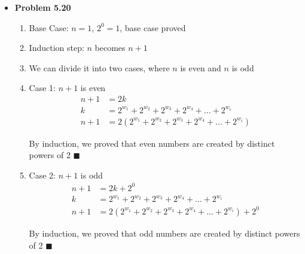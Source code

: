 \documentclass{article}
\begin{document}
\begin{itemize}
        \item \textbf{Problem 5.20}
        \begin{enumerate}
            \item Base Case: $n = 1$, $2^0 = 1$, base case proved 
            \item Induction step: $n$ becomes $n+1$
            \item We can divide it into two cases, where $n$ is even and $n$ is odd
            \item Case 1: $n + 1$ is even
            \begin{align*}
                n + 1&= 2k\\
                k &= 2^{w_1} + 2^{w_2} + 2^{w_3} + 2^{w_4} + ... + 2^{w_i}\\
                n + 1&= 2(2^{w_1} + 2^{w_2} + 2^{w_3} + 2^{w_4} + ... + 2^{w_i})
            \end{align*}
            \begin{center}
                By induction, we proved that even numbers are created by distinct powers of 2 $\blacksquare$
            \end{center}

            \item Case 2: $n + 1$ is odd
            \begin{align*}
                n + 1&=2k + 2^0\\
                k &= 2^{w_1} + 2^{w_2} + 2^{w_3} + 2^{w_4} + ... + 2^{w_i}\\
                n + 1 &= 2(2^{w_1} + 2^{w_2} + 2^{w_3} + 2^{w_4} + ... + 2^{w_i}) + 2^0
            \end{align*}
            \begin{center}
                By induction, we proved that odd numbers are created by distinct powers of 2 $\blacksquare$
            \end{center}
        \end{enumerate}
        

\end{itemize}
\end{document}
